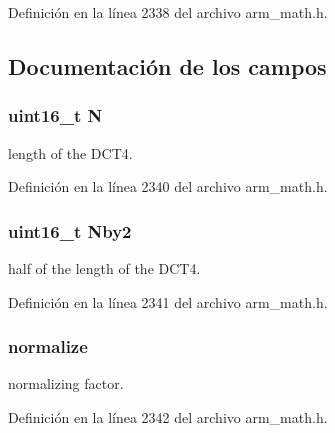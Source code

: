 Definición en la línea 2338 del archivo arm\+\_\+math.\+h.



\subsection{Documentación de los campos}
\subsubsection[{\texorpdfstring{N}{N}}]{\setlength{\rightskip}{0pt plus 5cm}uint16\+\_\+t N}\hypertarget{structarm__dct4__instance__q15_a37d49571fe35012087153c093705cd11}{}\label{structarm__dct4__instance__q15_a37d49571fe35012087153c093705cd11}
length of the D\+C\+T4. 

Definición en la línea 2340 del archivo arm\+\_\+math.\+h.

\subsubsection[{\texorpdfstring{Nby2}{Nby2}}]{\setlength{\rightskip}{0pt plus 5cm}uint16\+\_\+t Nby2}\hypertarget{structarm__dct4__instance__q15_afa64b1618089e35c2b55cff71cb29715}{}\label{structarm__dct4__instance__q15_afa64b1618089e35c2b55cff71cb29715}
half of the length of the D\+C\+T4. 

Definición en la línea 2341 del archivo arm\+\_\+math.\+h.

\subsubsection[{\texorpdfstring{normalize}{normalize}}]{ normalize}\hypertarget{structarm__dct4__instance__q15_a8ba8c9fa75542dac82553fee982ccd3e}{}\label{structarm__dct4__instance__q15_a8ba8c9fa75542dac82553fee982ccd3e}
normalizing factor. 

Definición en la línea 2342 del archivo arm\+\_\+math.\+h.

